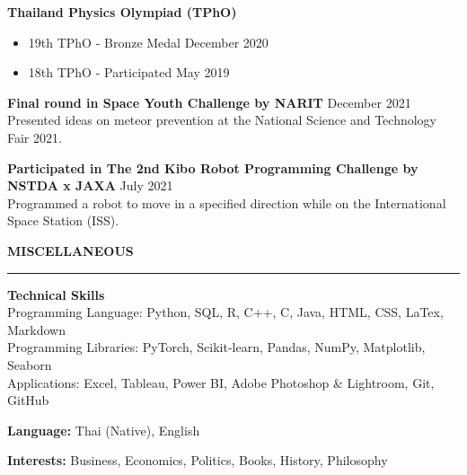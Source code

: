 \documentclass[11pt]{article}
\begin{document}
\vspace{6pt}

\textbf{Thailand Physics Olympiad (TPhO)}
\begin{itemize}[noitemsep, topsep=0pt, partopsep=0pt, parsep=0pt]
    \item 19th TPhO - Bronze Medal \hfill December 2020
    \item 18th TPhO - Participated \hfill May 2019
\end{itemize}


\vspace{6pt}

\textbf{Final round in Space Youth Challenge by NARIT} \hfill December 2021\\
\hspace*{7pt} Presented ideas on meteor prevention at the National Science and Technology Fair 2021.

\vspace{6pt}

\textbf{Participated in The 2nd Kibo Robot Programming Challenge by NSTDA x JAXA} \hfill July 2021\\
\hspace*{7pt} Programmed a robot to move in a specified direction while on the International Space Station (ISS).

\vspace{12pt}
\textbf{MISCELLANEOUS}
\vspace{5pt}
{\color{NavyBlue}\hrule}
\vspace{9pt}

\textbf{Technical Skills}\\
\hspace*{7pt} Programming Language: Python, SQL, R, C++, C, Java, HTML, CSS, LaTex, Markdown\\
\hspace*{7pt} Programming Libraries: PyTorch, Scikit-learn, Pandas, NumPy, Matplotlib, Seaborn\\
\hspace*{7pt} Applications: Excel, Tableau, Power BI, Adobe Photoshop \& Lightroom, Git, GitHub

\textbf{Language:} Thai (Native), English

\textbf{Interests:} Business, Economics, Politics, Books, History, Philosophy
\end{document}
